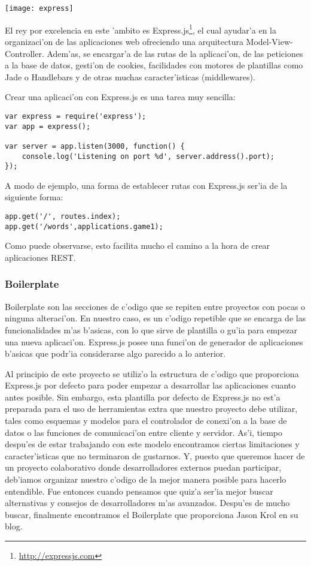 \begin{center}
\texttt{[image: express]}
\end{center}

El rey por excelencia en este 'ambito es Express.js\footnote{\url{http://expressjs.com}}, el cual ayudar'a en la organizaci'on de las aplicaciones web ofreciendo una arquitectura
Model-View-Controller. Adem'as, se encargar'a de las rutas de la aplicaci'on, de las peticiones a la base de datos, gesti'on de cookies,
facilidades con motores de plantillas como Jade o Handlebars y de otras muchas caracter'isticas (middlewares).

Crear una aplicaci'on con Express.js es una tarea muy sencilla:

\begin{verbatim}
var express = require('express');
var app = express();

var server = app.listen(3000, function() {
    console.log('Listening on port %d', server.address().port);
});
\end{verbatim}


A modo de ejemplo, una forma de establecer rutas con Express.js ser'ia de la siguiente forma:
\begin{verbatim}
app.get('/', routes.index);
app.get('/words',applications.game1);
\end{verbatim}

Como puede observarse, esto facilita mucho el camino a la hora de crear aplicaciones REST.

\subsubsection[Boilerplate (FDB)]{Boilerplate}
\label{sub:boilerplate}
Boilerplate son las secciones de c'odigo que se repiten entre proyectos con pocas o ninguna alteraci'on. En nuestro caso, es un c'odigo repetible
que se encarga de las funcionalidades m'as b'asicas, con lo que sirve de plantilla o gu'ia para empezar una nueva aplicaci'on. Express.js posee
una funci'on de generador de aplicaciones b'asicas que podr'ia considerarse algo parecido a lo anterior.

Al principio de este proyecto se utiliz'o la estructura de c'odigo que proporciona Express.js por defecto para poder empezar a desarrollar las aplicaciones
cuanto antes posible. Sin embargo, esta plantilla por defecto de Express.js no est'a preparada para el uso de herramientas extra que nuestro proyecto debe utilizar,
tales como esquemas y modelos para el controlador de conexi'on a la base de datos o las funciones de comunicaci'on entre cliente y servidor. As'i, tiempo
despu'es de estar trabajando con este modelo encontramos ciertas limitaciones y caracter'isticas que no terminaron de gustarnos. Y, puesto que
queremos hacer de \Nipponline{} un proyecto colaborativo donde desarrolladores externos puedan participar, deb'iamos organizar nuestro c'odigo de la
mejor manera posible para hacerlo entendible. Fue entonces cuando pensamos que quiz'a ser'ia mejor buscar alternativas y consejos de desarrolladores
m'as avanzados. Despu'es de mucho buscar, finalmente encontramos el Boilerplate que proporciona Jason Krol en su blog\cite{jkrol}.


